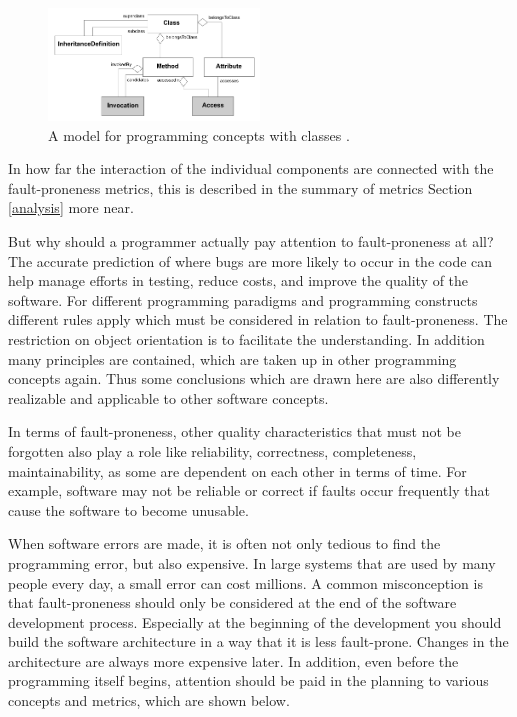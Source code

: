 \begin{figure}[htbp]
	\centerline{\includegraphics[width=0.5\textwidth]{pictures/oodesign.png}}
	\caption{A model for programming concepts with classes \cite{lanza2002beyond}.}
	\label{fig0}
\end{figure}

In how far the interaction of the individual components are connected with the fault-proneness metrics, this is described in the summary of metrics Section \ref{analysis} more near.%

But why should a programmer actually pay attention to fault-proneness at all? The accurate prediction of where bugs are more likely to occur in the code can help manage efforts in testing, reduce costs, and improve the quality of the software. For different programming paradigms and programming constructs different rules apply which must be considered in relation to fault-proneness.  The restriction on object orientation is to facilitate the understanding. In addition many principles are contained, which are taken up in other programming concepts again. Thus some conclusions which are drawn here are also differently realizable and applicable to other software concepts.

In terms of fault-proneness, other quality characteristics that must not be forgotten also play a role like reliability, correctness, completeness, maintainability, as some are dependent on each other in terms of time. For example, software may not be reliable or correct if faults occur frequently that cause the software to become unusable.%

When software errors are made, it is often not only tedious to find the programming error, but also expensive. In large systems that are used by many people every day, a small error can cost millions. A common misconception is that fault-proneness should only be considered at the end of the software development process. Especially at the beginning of the development you should build the software architecture in a way that it is less fault-prone. Changes in the architecture are always more expensive later. In addition, even before the programming itself begins, attention should be paid in the planning to various concepts and metrics, which are shown below.

